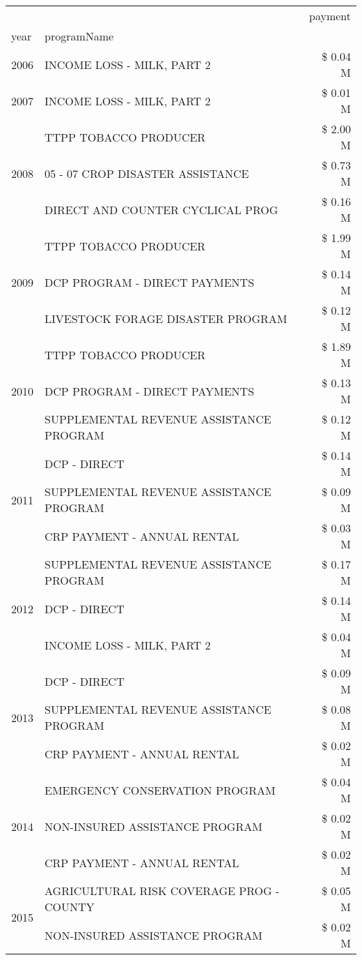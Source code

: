 \begin{tabular}{llr}
\toprule
 &  & payment \\
year & programName &  \\
\midrule
2006 & INCOME LOSS - MILK, PART 2 & \$ 0.04 M \\
\cline{1-3}
2007 & INCOME LOSS - MILK, PART 2 & \$ 0.01 M \\
\cline{1-3}
\multirow[t]{3}{*}{2008} & TTPP TOBACCO PRODUCER & \$ 2.00 M \\
 & 05 - 07 CROP DISASTER ASSISTANCE & \$ 0.73 M \\
 & DIRECT AND COUNTER CYCLICAL PROG & \$ 0.16 M \\
\cline{1-3}
\multirow[t]{3}{*}{2009} & TTPP TOBACCO PRODUCER & \$ 1.99 M \\
 & DCP PROGRAM - DIRECT PAYMENTS & \$ 0.14 M \\
 & LIVESTOCK FORAGE DISASTER  PROGRAM & \$ 0.12 M \\
\cline{1-3}
\multirow[t]{3}{*}{2010} & TTPP TOBACCO PRODUCER & \$ 1.89 M \\
 & DCP PROGRAM - DIRECT PAYMENTS & \$ 0.13 M \\
 & SUPPLEMENTAL REVENUE ASSISTANCE PROGRAM & \$ 0.12 M \\
\cline{1-3}
\multirow[t]{3}{*}{2011} & DCP - DIRECT & \$ 0.14 M \\
 & SUPPLEMENTAL REVENUE ASSISTANCE PROGRAM & \$ 0.09 M \\
 & CRP PAYMENT - ANNUAL RENTAL & \$ 0.03 M \\
\cline{1-3}
\multirow[t]{3}{*}{2012} & SUPPLEMENTAL REVENUE ASSISTANCE PROGRAM & \$ 0.17 M \\
 & DCP - DIRECT & \$ 0.14 M \\
 & INCOME LOSS - MILK, PART 2 & \$ 0.04 M \\
\cline{1-3}
\multirow[t]{3}{*}{2013} & DCP - DIRECT & \$ 0.09 M \\
 & SUPPLEMENTAL REVENUE ASSISTANCE PROGRAM & \$ 0.08 M \\
 & CRP PAYMENT - ANNUAL RENTAL & \$ 0.02 M \\
\cline{1-3}
\multirow[t]{3}{*}{2014} & EMERGENCY CONSERVATION PROGRAM & \$ 0.04 M \\
 & NON-INSURED ASSISTANCE PROGRAM & \$ 0.02 M \\
 & CRP PAYMENT - ANNUAL RENTAL & \$ 0.02 M \\
\cline{1-3}
\multirow[t]{3}{*}{2015} & AGRICULTURAL RISK COVERAGE PROG - COUNTY & \$ 0.05 M \\
 & NON-INSURED ASSISTANCE PROGRAM & \$ 0.02 M \\

\end{tabular}
